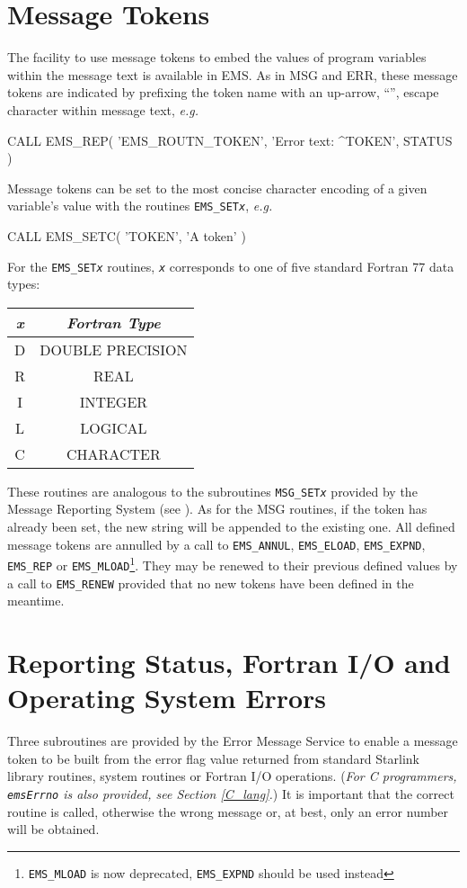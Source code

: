 \documentclass[twoside,11pt]{starlink}
\begin{document}
\section{Message Tokens}
The facility to use message tokens to embed the values of program variables
within the message text is available in EMS.
As in MSG and ERR, these message tokens are  indicated by prefixing the token
name with an up-arrow, ``\wedge'', escape character within message text,
\textit{e.g.}
\begin{terminalv}
CALL EMS_REP( 'EMS_ROUTN_TOKEN', 'Error text: ^TOKEN', STATUS )
\end{terminalv}
Message tokens can be set to the most concise character encoding of a given
variable's value with the routines \texttt{EMS\_SET\textit{x}}, \textit{e.g.}
\begin{terminalv}
CALL EMS_SETC( 'TOKEN', 'A token' )
\end{terminalv}
For the \texttt{EMS\_SET\textit{x}} routines, \texttt{\textit{x}} corresponds
to one of five standard Fortran 77 data types:
\begin {center}
\begin {tabular}{||c|c||}
\hline
\textit{\textit{x}} & \textit{Fortran Type}\\
\hline
D & DOUBLE PRECISION\\
R & REAL\\
I & INTEGER\\
L & LOGICAL\\
C & CHARACTER\\
\hline
\end {tabular}
\end {center}
These routines are analogous to the subroutines \texttt{MSG\_SET\textit{x}}
provided by the Message Reporting System (see
).
As for the MSG routines, if the token has already been set, the new string
will be appended to the existing one.
All defined message tokens are annulled by a call to \texttt{EMS\_ANNUL},
\texttt{EMS\_ELOAD},
\texttt{EMS\_EXPND}, \texttt{EMS\_REP} or
\texttt{EMS\_MLOAD}\footnote{\texttt{EMS\_MLOAD} is now deprecated,
\texttt{EMS\_EXPND} should be used instead}.
They may be renewed to their previous defined values by a call to
\texttt{EMS\_RENEW} provided that no new tokens have been defined in the
meantime.

\section{Reporting
Status, Fortran I/O and Operating System Errors}\label{Stat_sect}
Three subroutines are provided by the Error Message Service to enable a message
token to be built from the error flag value returned from standard Starlink
library routines, system routines or Fortran I/O operations. (\emph{For C
programmers, \texttt{emsErrno} is also provided, see Section \ref{C_lang}.})
It is important that the correct routine is called, otherwise the wrong
message or, at best, only an error number will be obtained.
\end{document}

